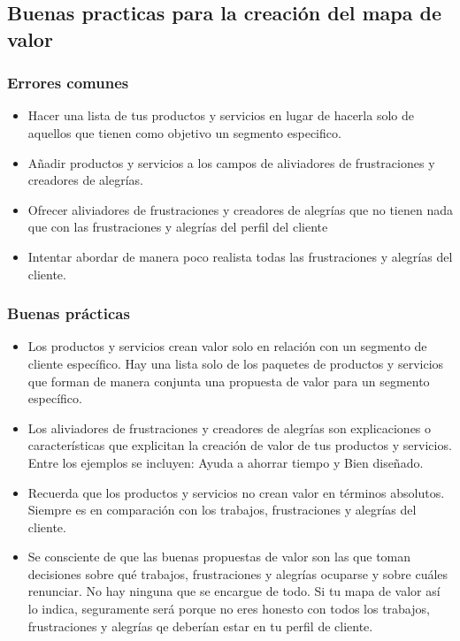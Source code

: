 \documentclass[11pt]{book}
\begin{document}
\subsection{Buenas practicas para la creación del mapa de valor}
\subsubsection{Errores comunes}
\begin{itemize}
\item Hacer una lista de tus productos y servicios en lugar de hacerla solo de aquellos que tienen como objetivo un segmento especifico.
\item Añadir productos y servicios a los campos de aliviadores de frustraciones y creadores de alegrías.
\item Ofrecer aliviadores de frustraciones y creadores de alegrías que no tienen nada que con las frustraciones y alegrías del perfil del cliente
\item Intentar abordar de manera poco realista todas las frustraciones y alegrías del cliente.
\end{itemize}
\subsubsection{Buenas prácticas}
\begin{itemize}
\item Los productos y servicios crean valor solo en relación con un segmento de cliente específico. Hay una lista solo de los paquetes de productos y servicios que forman de manera conjunta una propuesta de valor para un segmento específico.
\item Los aliviadores de frustraciones y creadores de alegrías son explicaciones o características que explicitan la creación de valor de tus productos y servicios. Entre los ejemplos se incluyen: Ayuda a ahorrar tiempo y Bien diseñado.
\item Recuerda que los productos y servicios no crean valor en términos absolutos. Siempre es en comparación con los trabajos, frustraciones y alegrías del cliente.
\item Se consciente de que las buenas propuestas de valor son las que toman decisiones sobre qué trabajos, frustraciones y alegrías ocuparse y sobre cuáles renunciar. No hay ninguna que se encargue de todo. Si tu mapa de valor así lo indica, seguramente será porque no eres honesto con todos los trabajos, frustraciones y alegrías qe deberían estar en tu perfil de cliente.
\end{itemize}
\end{document}
